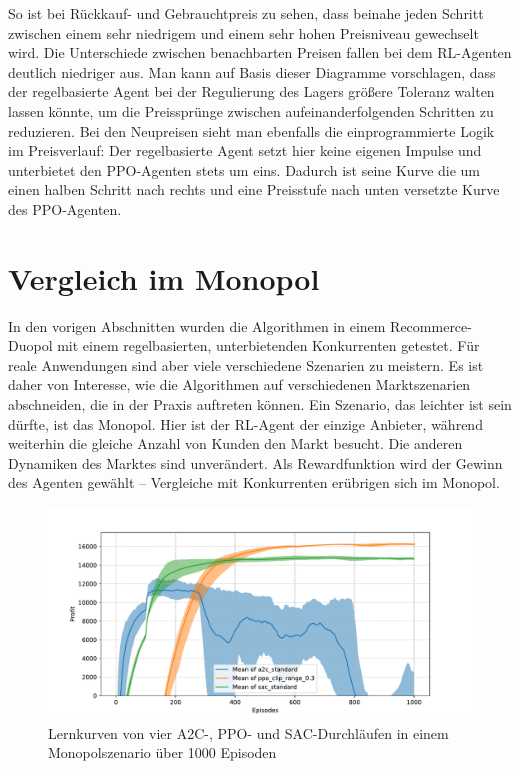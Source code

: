 So ist bei Rückkauf- und Gebrauchtpreis zu sehen, dass beinahe jeden Schritt zwischen einem sehr niedrigem und einem sehr hohen Preisniveau gewechselt wird.
Die Unterschiede zwischen benachbarten Preisen fallen bei dem RL-Agenten deutlich niedriger aus.
Man kann auf Basis dieser Diagramme vorschlagen, dass der regelbasierte Agent bei der Regulierung des Lagers größere Toleranz walten lassen könnte, um die Preissprünge zwischen aufeinanderfolgenden Schritten zu reduzieren.
Bei den Neupreisen sieht man ebenfalls die einprogrammierte Logik im Preisverlauf:
Der regelbasierte Agent setzt hier keine eigenen Impulse und unterbietet den PPO-Agenten stets um eins.
Dadurch ist seine Kurve die um einen halben Schritt nach rechts und eine Preisstufe nach unten versetzte Kurve des PPO-Agenten.

\section{Vergleich im Monopol}
In den vorigen Abschnitten wurden die Algorithmen in einem Recommerce-Duopol mit einem regelbasierten, unterbietenden Konkurrenten getestet.
Für reale Anwendungen sind aber viele verschiedene Szenarien zu meistern.
Es ist daher von Interesse, wie die Algorithmen auf verschiedenen Marktszenarien abschneiden, die in der Praxis auftreten können.
Ein Szenario, das leichter ist sein dürfte, ist das Monopol.
Hier ist der RL-Agent der einzige Anbieter, während weiterhin die gleiche Anzahl von Kunden den Markt besucht.
Die anderen Dynamiken des Marktes sind unverändert.
Als Rewardfunktion wird der Gewinn des Agenten gewählt -- Vergleiche mit Konkurrenten erübrigen sich im Monopol.

\begin{figure}[htb]
	\centering
	\includegraphics[width=\textwidth]{main/comparison_monopoly.pdf}
	\caption{Lernkurven von vier A2C-, PPO- und SAC-Durchläufen in einem Monopolszenario über 1000 Episoden}
	\label{graphic:MonopolyComparison}
\end{figure}

